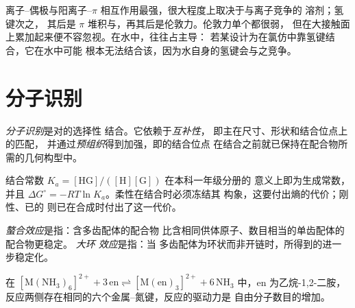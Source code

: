 离子–偶极与阳离子–$\pi$ 相互作用最强，很大程度上取决于与离子竞争的
溶剂；氢键次之，
其后是 $\pi$ 堆积与，再其后是伦敦力。伦敦力单个都很弱，
但在大接触面上累加起来便不容忽视。在水中，往往占主导：
若某设计为在氯仿中靠氢键结合，它在水中可能
根本无法结合该，因为水自身的氢键会与之竞争。

\section{分子识别}

\begin{definition}[分子识别]\label{def:b3:supramolecular:recognition}
\emph{分子识别}是对的选择性
结合。它依赖于\emph{互补性}，
即主在尺寸、形状和结合位点上的匹配，
并通过\emph{预组织}得到加强，即的结合位点
在结合之前就已保持在配合物所需的几何构型中。
\end{definition}

结合常数 $K_a = [\mathrm{HG}]/([\mathrm H][\mathrm G])$ 在本科一年级分册的
意义上即为生成常数，并且 $\Delta G^\circ = -RT\ln K_a$。柔性在结合时必须冻结其
构象，这要付出熵的代价；刚性、已的
则已在合成时付出了这一代价。

\begin{definition}[螯合效应与大环效应]\label{def:b3:supramolecular:macrocyclic}
\emph{螯合效应}是指：含多齿配体的配合物
比含相同供体原子、数目相当的单齿配体的配合物更稳定。
\emph{大环
效应}是指：当
多齿配体为环状而非开链时，所得到的进一步稳定化。
\end{definition}

\begin{proposition}[螯合效应主要是熵效应]\label{prop:b3:supramolecular:chelate-entropy}
在 $\mathrm{[M(NH_3)_6]^{2+} + 3\,en \rightleftharpoons [M(en)_3]^{2+} + 6\,NH_3}$ 中，en 为乙烷-1,2-二胺，
反应两侧存在相同的六个金属–氮键，反应的驱动力是
自由分子数目的增加。
\end{proposition}


